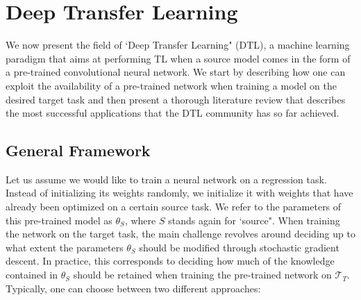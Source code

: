 \section{Deep Transfer Learning}
\label{sec:literature_review}

We now present the field of `Deep Transfer Learning" (DTL), a machine learning paradigm that aims at performing TL when a source model comes in the form of a pre-trained convolutional neural network. We start by describing how one can exploit the availability of a pre-trained network when training a model on the desired target task and then present a thorough literature review that describes the most successful applications that the DTL community has so far achieved.

\subsection{General Framework}
\label{sec:tl_general_framework}

Let us assume we would like to train a neural network on a regression task. Instead of initializing its weights randomly, we initialize it with weights that have already been optimized on a certain source task. We refer to the parameters of this pre-trained model as $\theta_S$, where $S$ stands again for `source". When training the network on the target task, the main challenge revolves around deciding up to what extent the parameters $\theta_S$ should be modified through stochastic gradient descent. In practice, this corresponds to deciding how much of the knowledge contained in $\theta_S$ should be retained when training the pre-trained network on $\mathcal{T}_T$. Typically, one can choose between two different approaches:  

